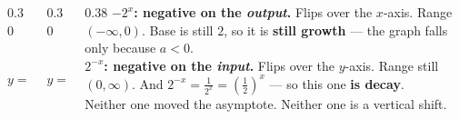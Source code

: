 \documentclass[aspectratio=169, 11pt]{beamer}
\newcommand{\lgrid}[4]{%
  \draw[step=1, linegray!45, thin] (#1,#3) grid (#2,#4);
  \draw[->, thick, charcoal] (#1,0)--(#2,0) node[below right, font=\tiny]{$x$};
  \draw[->, thick, charcoal] (0,#3)--(0,#4) node[left, font=\tiny]{$y$};}
\newcommand{\expgraph}[6]{\draw[very thick, forest, domain=#5:#6, samples=140, smooth]
  plot (\x,{(#1)*exp((#2)*((\x)-(#3)))+(#4)});}
\newcommand{\hasym}[3]{\draw[navy, dashed, thick] (#1,#3)--(#2,#3);}
\begin{document}
\begin{frame}[t, plain]
  \begin{columns}[T]
    \begin{column}{0.30\textwidth}
      \centering
      \\[2pt]
      {\footnotesize $y=-2^{x}$}
    \end{column}
    \begin{column}{0.30\textwidth}
      \centering
      \\[2pt]
      {\footnotesize $y=2^{-x}$}
    \end{column}
    \begin{column}{0.38\textwidth}
      \footnotesize
      \textbf{$-2^{x}$: negative on the \emph{output}.}
      Flips over the $x$-axis. Range $(-\infty,0)$. Base is still $2$, so it is \textbf{still growth} ---
      the graph falls only because $a<0$. \\[6pt]
      \textbf{$2^{-x}$: negative on the \emph{input}.}
      Flips over the $y$-axis. Range still $(0,\infty)$. And
      $2^{-x}=\frac{1}{2^{x}}=\left(\frac12\right)^{x}$ --- so this one \textbf{is decay}. \\[6pt]
      Neither one moved the asymptote. Neither one is a vertical shift.
    \end{column}
  \end{columns}
\end{frame}
\end{document}
